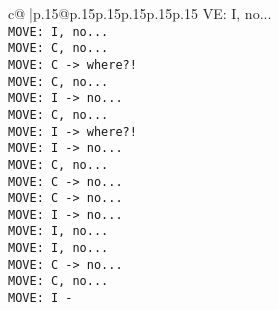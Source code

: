\documentclass{article}
\begin{document}
{\begin{supertabular}{c@{$\;$}|p{.15\linewidth}@{}p{.15\linewidth}p{.15\linewidth}p{.15\linewidth}p{.15\linewidth}p{.15\linewidth}}
{{{VE: I, no...\\ \tt  MOVE: I, no...\\ \tt  MOVE: C, no...\\ \tt  MOVE: C -> where?!\\ \tt  MOVE: C, no...\\ \tt  MOVE: I -> no...\\ \tt  MOVE: C, no...\\ \tt  MOVE: I -> where?!\\ \tt  MOVE: I -> no...\\ \tt  MOVE: C, no...\\ \tt  MOVE: C -> no...\\ \tt  MOVE: C -> no...\\ \tt  MOVE: I -> no...\\ \tt  MOVE: I, no...\\ \tt  MOVE: I, no...\\ \tt  MOVE: C -> no...\\ \tt  MOVE: C, no...\\ \tt  MOVE: I -}}}
\end{supertabular}}
\end{document}
